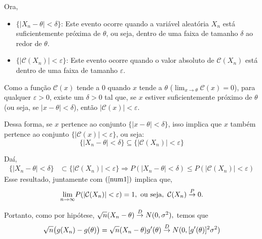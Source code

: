 \documentclass[12pt]{beamer}
\begin{document}
\begin{frame}{}
	\begin{block}{}
		\justifying
Ora, 

\begin{itemize}
	\item $\{|X_{n} - \theta| < \delta\}$: Este evento ocorre quando a variável aleatória $X_{n}$ está suficientemente próxima de $\theta$, ou seja, dentro de uma faixa de tamanho $\delta$ ao redor de $\theta$.
	
	\item $\{|\mathcal{C}(X_{n})| < \varepsilon\}$: Este evento ocorre quando o valor absoluto de $\mathcal{C}(X_{n})$ está dentro de uma faixa de tamanho $\varepsilon$.
\end{itemize}
Como a função $\mathcal{C}(x)$ tende a $0$ quando $x$ tende a $\theta$ ($\lim_{x \to \theta} \mathcal{C}(x) = 0$), para qualquer $\varepsilon > 0$, existe um $\delta > 0$ tal que, se $x$ estiver suficientemente próximo de $\theta$ (ou seja, se $|x - \theta| < \delta$), então $|\mathcal{C}(x)| < \varepsilon$.

Dessa forma, se $x$ pertence ao conjunto $\{|x - \theta| < \delta\}$, isso implica que $x$ também pertence ao conjunto $\{|\mathcal{C}(x)| < \varepsilon\}$, ou seja:
\[
\{|X_n - \theta| < \delta\} \subseteq \{|\mathcal{C}(X_n)| < \varepsilon\}
\]
	\end{block}
\end{frame}

\begin{frame}{}
	\begin{block}{}
		\justifying
		Daí,
		\begin{align*}
			\{|X_{n}-\theta|<\delta\}&\subset \{|\mathcal{C}(X_{n})|<\varepsilon\}\Rightarrow P(|X_{n}-\theta|<\delta)\leq P(|\mathcal{C}(X_{n})|<\varepsilon)
		\end{align*}
		Esse resultado, juntamente com $(\ref{num1})$ implica que,
		\begin{align*}
			{\displaystyle \lim_{n\to\infty}} P(|\mathcal{C}(X_{n})|<\varepsilon)=1,~\text{ou seja},~\mathcal{C}(X_{n})\overset{P}{\rightarrow} 0.
		\end{align*}
	\end{block}
	\pause
	\begin{block}{}
	Portanto, como por hipótese, $\sqrt{n}(X_{n}-\theta)\overset{D}{\rightarrow} N(0,\sigma^{2}),$ temos que 
	$$\sqrt{n}\big(g(X_{n})-g(\theta)\big)=\sqrt{n}(X_{n}-\theta)g'(\theta)\overset{D}{\rightarrow} N(0,[g'(\theta)]^{2}\sigma^{2})$$
	\end{block}
\end{frame}
\end{document}
